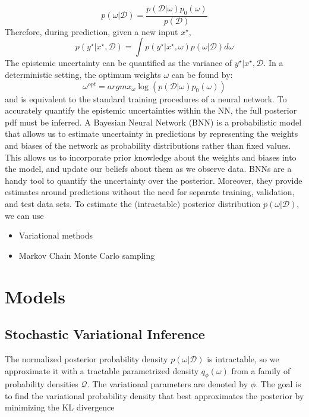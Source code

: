 \documentclass[11pt,a4paper]{article}
\begin{document}
\begin{equation}
    p(\omega|\mathcal{D}) = \frac{ p(\mathcal{D}|\omega) p_0(\omega) }{p(\mathcal{D})}
\end{equation}
Therefore, during prediction, given a new input $x^{\star}$,
\begin{equation}
    p(y^{\star}| x^{\star}, \mathcal{D}) = \int p(y^{\star}| x^{\star}, \omega) p(\omega|\mathcal{D})d\omega
\end{equation}
The epistemic uncertainty can be quantified as the variance of $y^{\star}| x^{\star}, \mathcal{D}$. In a deterministic setting, the optimum weights $\omega$ can be found by:
\begin{equation}
    \omega^{opt} = argmx_{\omega} \log( p(\mathcal{D}|\omega) p_0(\omega) )
\end{equation}
and is equivalent to the standard training procedures of a neural network. To accurately quantify the epistemic uncertainties within the NN, the full posterior pdf must be inferred. 
A Bayesian Neural Network (BNN) is a probabilistic model that allows us to estimate uncertainty in predictions by representing the weights and biases of the network as probability distributions rather than fixed values. This allows us to incorporate prior knowledge about the weights and biases into the model, and update our beliefs about them as we observe data. BNNs are a handy tool to quantify the uncertainty over the posterior. Moreover, they provide estimates around predictions without the need for separate training, validation, and test data sets. 
To estimate the (intractable) posterior distribution $p(\omega|\mathcal{D})$, we can use
\begin{itemize}
    \item Variational methods
    \item Markov Chain Monte Carlo sampling
\end{itemize}




\section{Models}
\subsection{Stochastic Variational Inference}

The normalized posterior probability density $p(\omega|\mathcal{D})$ is intractable, so we approximate it with a tractable parametrized density $q_{\phi}(\omega)$ from a family of probability densities $\mathcal{Q}$. The variational parameters are denoted by $\phi$. The goal is to find the variational probability density that best approximates the posterior by minimizing the KL divergence
\end{document}
